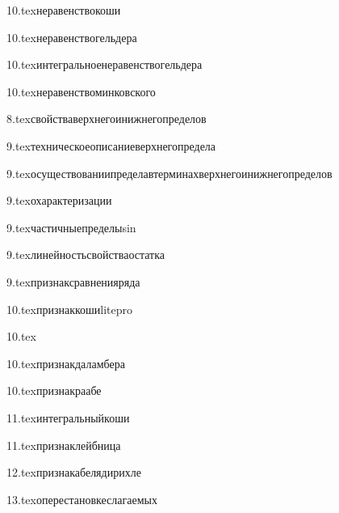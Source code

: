 {10.tex}{неравенствокоши}

{10.tex}{неравенствогельдера}

{10.tex}{интегральноенеравенствогельдера}

{10.tex}{неравенствоминковского}

{8.tex}{свойстваверхнегоинижнегопределов}

{9.tex}{техническоеописаниеверхнегопредела}

{9.tex}{осуществованиипределавтерминахверхнегоинижнегопределов}

{9.tex}{охарактеризации}

{9.tex}{частичныепределыsin}

{9.tex}{линейностьсвойстваостатка}

{9.tex}{признаксравненияряда}

{10.tex}{признаккошиlitepro}
\label{признаккошиpro}

{10.tex}{}

{10.tex}{признакдаламбера}

{10.tex}{признакраабе}

{11.tex}{интегральныйкоши}

{11.tex}{признаклейбница}

{12.tex}{признакабелядирихле}

{13.tex}{оперестановкеслагаемых}

